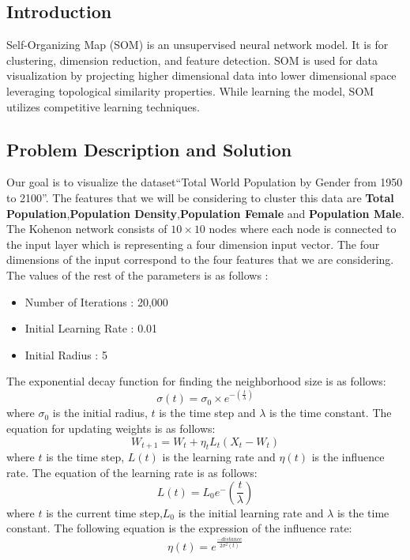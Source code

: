 \documentclass[a4paper, 11pt]{article}
\begin{document}
\subsection{Introduction}
Self-Organizing Map (SOM) is an unsupervised neural network model. It is for clustering, dimension reduction, and feature detection. SOM is used for data visualization by projecting higher dimensional data into lower dimensional space leveraging topological similarity properties. While learning the model, SOM utilizes competitive learning techniques. 
\subsection{Problem Description and Solution}
Our goal is to visualize the dataset``Total World Population by Gender from 1950 to 2100''. The features that we will be considering to cluster this data are \textbf{Total Population},\textbf{Population Density},\textbf{Population Female} and \textbf{Population Male}.
\newline
The Kohenon network consists of $10 \times 10 $ nodes where each node is connected to the input layer which is representing a four dimension input vector. The four dimensions of the input correspond to the four features that we are considering. The values of the rest of the parameters is as follows :
\begin{itemize}
    \item Number of Iterations : 20,000
    \item Initial Learning Rate : 0.01
    \item Initial Radius : 5
\end{itemize}
The exponential decay function for finding the neighborhood size is as follows:
$$ \sigma(t) = \sigma_0 \times e^{-(\frac{t}{ \lambda})}$$
where $\sigma_0$ is the initial radius, $t$ is the time step and $\lambda$ is the time constant. 
The equation for updating weights is as follows:
$$ W_{t+1} = W_{t} + \eta_{t} L_{t} (X_t - W_t) $$
where $t$ is the time step, $L(t)$ is the learning rate and $\eta(t)$ is the influence rate. 
The equation of the learning rate is as follows:
$$ L(t) = L_0 e ^ -({\frac{t}{\lambda}})$$
where $t$ is the current time step,$L_0$ is the initial learning rate  and $\lambda$ is the time constant.
The following equation is the expression of the influence rate:
$$\eta(t) = e^\frac{-distance}{2 \sigma^2(t)}$$
\end{document}
